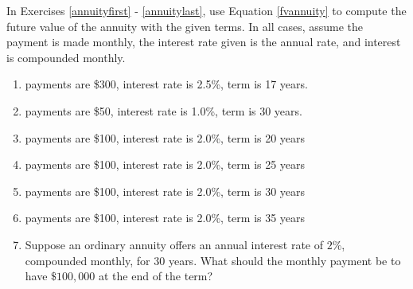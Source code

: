 \pagebreak

In Exercises \ref{annuityfirst} - \ref{annuitylast}, use Equation \ref{fvannuity} to compute the future value of the annuity with the given terms.  In all cases, assume the payment is made monthly, the interest rate given is the annual rate, and interest is compounded monthly.

\begin{enumerate}
\setcounter{enumi}{\value{HW}}

\item payments are \$300, interest rate is 2.5\%, term is 17 years. \label{annuityfirst}

\item payments are \$50, interest rate is 1.0\%,  term is 30 years. 

\item payments are \$100, interest rate is 2.0\%, term is 20 years 

\item  payments are \$100, interest rate is 2.0\%,  term is  25 years

\item  payments are \$100, interest rate is 2.0\%,  term is  30 years


\item  payments are \$100, interest rate is 2.0\%,  term is  35 years
\label{annuitylast}   
 
\item Suppose an ordinary annuity offers an annual interest rate of $2 \%$, compounded monthly, for 30 years. What should the monthly payment be to have $\$100,\!000$ at the end of the term? 

\setcounter{HW}{\value{enumi}}
\end{enumerate}

